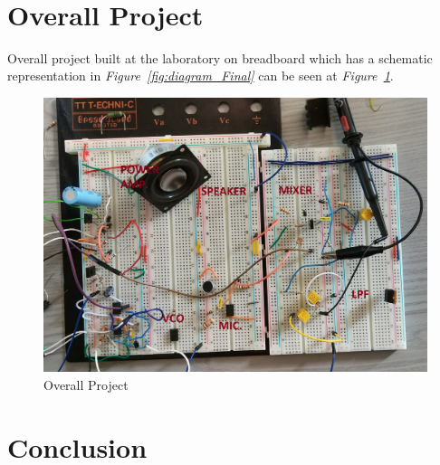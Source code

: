 \documentclass[paper]{IEEEtran}
\begin{document}
\-\\[0.5cm]
		
\section{Overall Project}


	Overall project built at the laboratory on breadboard which has a schematic representation in \textit{Figure~\ref{fig:diagram_Final}} can be seen at \textit{Figure~\ref{fig:overall}}. \\[7cm]

\begin{figure}[h!]
\setlength{\unitlength}{\textwidth}
\center 
\includegraphics[width=1.0\unitlength]{overall_cct2.jpg}
\caption{\label{fig:overall}Overall Project }
\end{figure}	

\section{Conclusion}
\end{document}
